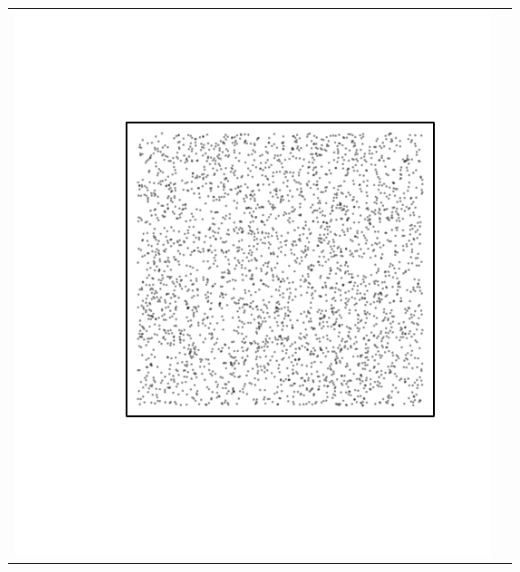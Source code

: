 \documentclass{article}\usepackage{graphicx, color}
\makeatletter
\def\maxwidth{ %
  \ifdim\Gin@nat@width>\linewidth
    \linewidth
  \else
    \Gin@nat@width
  \fi
}
\newenvironment{knitrout}{}{} %
\makeatother
\begin{document}
\vspace*{-1.75in}
\begin{tabular}{cc}
\begin{knitrout}
\definecolor{shadecolor}{rgb}{0.969, 0.969, 0.969}\color{fgcolor}\includegraphics[width=\maxwidth]{figure/unnamed-chunk-19} 
\end{knitrout}


\end{tabular}
\end{document}
